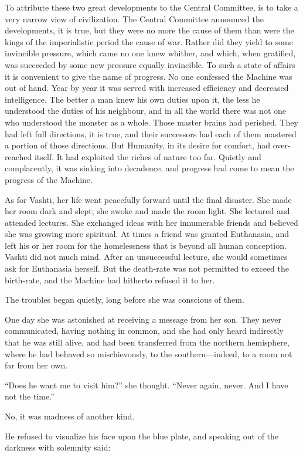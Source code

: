 To attribute these two great developments to the Central Committee, is to take a very narrow view of civilization. The Central Committee announced the developments, it is true, but they were no more the cause of them than were the kings of the imperialistic period the cause of war. Rather did they yield to some invincible pressure, which came no one knew whither, and which, when gratified, was succeeded by some new pressure equally invincible. To such a state of affairs it is convenient to give the name of progress. No one confessed the Machine was out of hand. Year by year it was served with increased efficiency and decreased intelligence. The better a man knew his own duties upon it, the less he understood the duties of his neighbour, and in all the world there was not one who understood the monster as a whole. Those master brains had perished. They had left full directions, it is true, and their successors had each of them mastered a portion of those directions. But Humanity, in its desire for comfort, had over-reached itself. It had exploited the riches of nature too far. Quietly and complacently, it was sinking into decadence, and progress had come to mean the progress of the Machine.

As for Vashti, her life went peacefully forward until the final disaster. She made her room dark and slept; she awoke and made the room light. She lectured and attended lectures. She exchanged ideas with her innumerable friends and believed she was growing more spiritual. At times a friend was granted Euthanasia, and left his or her room for the homelessness that is beyond all human conception. Vashti did not much mind. After an unsuccessful lecture, she would sometimes ask for Euthanasia herself. But the death-rate was not permitted to exceed the birth-rate, and the Machine had hitherto refused it to her.

The troubles began quietly, long before she was conscious of them.

One day she was astonished at receiving a message from her son. They never communicated, having nothing in common, and she had only heard indirectly that he was still alive, and had been transferred from the northern hemisphere, where he had behaved so mischievously, to the southern---indeed, to a room not far from her own.

``Does he want me to visit him?'' she thought. ``Never again, never. And I have not the time.''

No, it was madness of another kind.

He refused to visualize his face upon the blue plate, and speaking out of the darkness with solemnity said:

